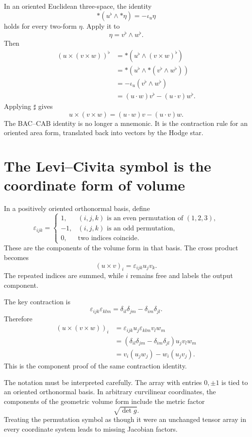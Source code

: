In an oriented Euclidean three-space, the identity
\[
  *(u^{\flat}\wedge *\eta)
  =-\iota_u\eta
\]
holds for every two-form \(\eta\).  Apply it to
\[
  \eta=v^{\flat}\wedge w^{\flat}.
\]
Then
\[
\begin{aligned}
  (u\times(v\times w))^{\flat}
  &=*\left(u^{\flat}\wedge(v\times w)^{\flat}\right)\\
  &=*\left(u^{\flat}\wedge*(v^{\flat}\wedge w^{\flat})\right)\\
  &=-\iota_u(v^{\flat}\wedge w^{\flat})\\
  &=(u\cdot w)v^{\flat}-(u\cdot v)w^{\flat}.
\end{aligned}
\]
Applying \(\sharp\) gives
\[
  \boxed{
  u\times(v\times w)
  =(u\cdot w)v-(u\cdot v)w.}
\]
The BAC--CAB identity is no longer a mnemonic.  It is the contraction rule for an oriented area form, translated back into vectors by the Hodge star.

\section{The Levi--Civita symbol is the coordinate form of volume}

In a positively oriented orthonormal basis, define
\[
  \varepsilon_{ijk}
  =
  \begin{cases}
    1,&(i,j,k)\text{ is an even permutation of }(1,2,3),\\
    -1,&(i,j,k)\text{ is an odd permutation},\\
    0,&\text{two indices coincide}.
  \end{cases}
\]
These are the components of the volume form in that basis.  The cross product becomes
\[
  (u\times v)_i
  =\varepsilon_{ijk}u_jv_k.
\]
The repeated indices are summed, while \(i\) remains free and labels the output component.

The key contraction is
\[
  \varepsilon_{ijk}\varepsilon_{klm}
  =\delta_{il}\delta_{jm}-\delta_{im}\delta_{jl}.
\]
Therefore
\[
\begin{aligned}
  (u\times(v\times w))_i
  &=\varepsilon_{ijk}u_j
    \varepsilon_{klm}v_lw_m\\
  &=(\delta_{il}\delta_{jm}-\delta_{im}\delta_{jl})
    u_jv_lw_m\\
  &=v_i(u_jw_j)-w_i(u_jv_j).
\end{aligned}
\]
This is the component proof of the same contraction identity.

The notation must be interpreted carefully.  The array with entries \(0,\pm1\) is tied to an oriented orthonormal basis.  In arbitrary curvilinear coordinates, the components of the geometric volume form include the metric factor
\[
  \sqrt{\det g}.
\]
Treating the permutation symbol as though it were an unchanged tensor array in every coordinate system leads to missing Jacobian factors.

